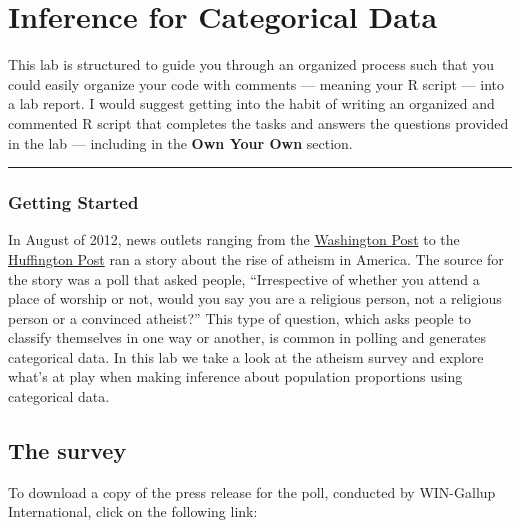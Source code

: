 \documentclass[]{book}
\theoremstyle{definition}
\theoremstyle{definition}
\theoremstyle{definition}
\theoremstyle{remark}
\begin{document}
\hypertarget{inference-for-categorical-data}{%
\chapter{Inference for Categorical
Data}\label{inference-for-categorical-data}}

This lab is structured to guide you through an organized process such
that you could easily organize your code with comments --- meaning your
R script --- into a lab report. I would suggest getting into the habit
of writing an organized and commented R script that completes the tasks
and answers the questions provided in the lab --- including in the
\textbf{Own Your Own} section.

\begin{center}\rule{0.5\linewidth}{\linethickness}\end{center}

\hypertarget{getting-started-3}{%
\subsection{Getting Started}\label{getting-started-3}}

In August of 2012, news outlets ranging from the
\href{http://www.washingtonpost.com/national/on-faith/poll-shows-atheism-on-the-rise-in-the-us/2012/08/13/90020fd6-e57d-11e1-9739-eef99c5fb285_story.html}{Washington
Post} to the
\href{http://www.huffingtonpost.com/2012/08/14/atheism-rise-religiosity-decline-in-america_n_1777031.html}{Huffington
Post} ran a story about the rise of atheism in America. The source for
the story was a poll that asked people, ``Irrespective of whether you
attend a place of worship or not, would you say you are a religious
person, not a religious person or a convinced atheist?'' This type of
question, which asks people to classify themselves in one way or
another, is common in polling and generates categorical data. In this
lab we take a look at the atheism survey and explore what's at play when
making inference about population proportions using categorical data.

\hypertarget{the-survey}{%
\section{The survey}\label{the-survey}}

To download a copy of the press release for the poll, conducted by
WIN-Gallup International, click on the following link:
\end{document}

